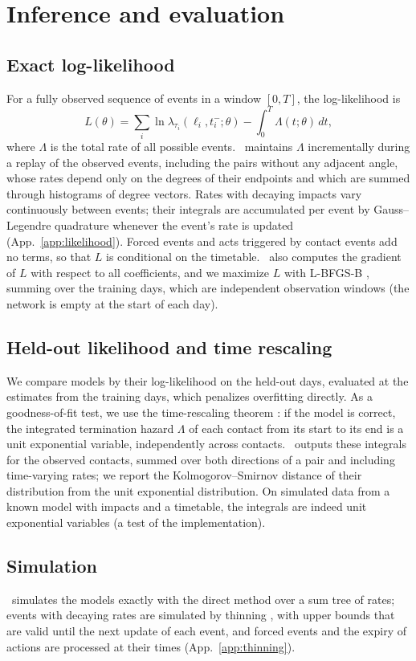 \section{Inference and evaluation}\label{sec:inference}

\subsection{Exact log-likelihood}
For a fully observed sequence of events in a window $[0, T]$, the log-likelihood is
\begin{equation}\label{eq:logl}
  L(\theta) = \sum_i \ln \lambda_{\tau_i}(\ell_i, t_i^-; \theta) - \int_0^T \Lambda(t; \theta)\,dt,
\end{equation}
where $\Lambda$ is the total rate of all possible events.
\tricl\ maintains $\Lambda$ incrementally during a replay of the observed events, including the pairs without any adjacent angle, whose rates depend only on the degrees of their endpoints and which are summed through histograms of degree vectors.
Rates with decaying impacts vary continuously between events; their integrals are accumulated per event by Gauss--Legendre quadrature whenever the event's rate is updated (App.~\ref{app:likelihood}).
Forced events and acts triggered by contact events add no terms, so that $L$ is conditional on the timetable.
\tricl\ also computes the gradient of $L$ with respect to all coefficients, and we maximize $L$ with L-BFGS-B \citep{byrd1995}, summing over the training days, which are independent observation windows (the network is empty at the start of each day).

\subsection{Held-out likelihood and time rescaling}
We compare models by their log-likelihood on the held-out days, evaluated at the estimates from the training days, which penalizes overfitting directly.
As a goodness-of-fit test, we use the time-rescaling theorem \citep{brown2002}: if the model is correct, the integrated termination hazard $\Lambda$ of each contact from its start to its end is a unit exponential variable, independently across contacts.
\tricl\ outputs these integrals for the observed contacts, summed over both directions of a pair and including time-varying rates; we report the Kolmogorov--Smirnov distance of their distribution from the unit exponential distribution.
On simulated data from a known model with impacts and a timetable, the integrals are indeed unit exponential variables (a test of the implementation).

\subsection{Simulation}
\tricl\ simulates the models exactly with the direct method over a sum tree of rates; events with decaying rates are simulated by thinning \citep{lewis1979,ogata1981}, with upper bounds that are valid until the next update of each event, and forced events and the expiry of actions are processed at their times (App.~\ref{app:thinning}).
